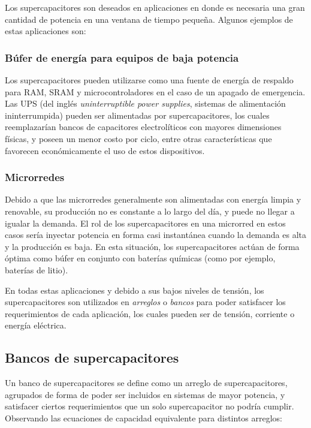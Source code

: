 Los supercapacitores son deseados en aplicaciones en donde es necesaria una gran cantidad de potencia en una ventana de tiempo pequeña. Algunos ejemplos de estas aplicaciones son:

\subsubsection{Búfer de energía para equipos de baja potencia}

Los supercapacitores pueden utilizarse como una fuente de energía de respaldo para RAM, SRAM y microcontroladores en el caso de un apagado de emergencia. Las UPS (del inglés \emph{uninterruptible power supplies}, sistemas de alimentación ininterrumpida) pueden ser alimentadas por supercapacitores, los cuales reemplazarían bancos de capacitores electrolíticos con mayores dimensiones físicas, y poseen un menor costo por ciclo, entre otras características que favorecen económicamente el uso de estos dispositivos.

\subsubsection{Microrredes}

Debido a que las microrredes generalmente son alimentadas con energía limpia y renovable, su producción no es constante a lo largo del día, y puede no llegar a igualar la demanda. El rol de los supercapacitores en una microrred en estos casos sería inyectar potencia en forma casi instantánea cuando la demanda es alta y la producción es baja. En esta situación, los supercapacitores actúan de forma óptima como búfer en conjunto con baterías químicas (como por ejemplo, baterías de litio).

En todas estas aplicaciones y debido a sus bajos niveles de tensión, los supercapacitores son utilizados en \emph{arreglos} o \emph{bancos} para poder satisfacer los requerimientos de cada aplicación, los cuales pueden ser de tensión, corriente o energía eléctrica.

\subsection{Bancos de supercapacitores}

Un banco de supercapacitores se define como un arreglo de supercapacitores, agrupados de forma de poder ser incluidos en sistemas de mayor potencia, y satisfacer ciertos requerimientos que un solo supercapacitor no podría cumplir. Observando las ecuaciones de capacidad equivalente para distintos arreglos:

